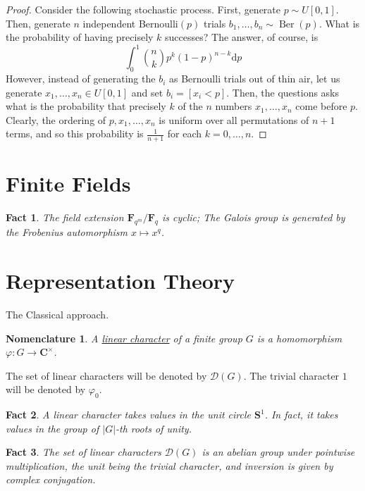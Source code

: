 \documentclass[12pt]{article}
\newtheorem*{fact*}{Fact}
\newtheorem*{nomn*}{Nomenclature}
\newcommand{\abs}[1]{\left\lvert#1\right\rvert}
\DeclareMathOperator{\ber}{Ber}
\renewcommand{\d}{\mathrm{d}}
\newcommand{\vphi}{\varphi}
\newcommand{\C}{\mathbf{C}}
\newcommand{\DD}{\mathscr{D}}
\newcommand{\F}{\mathbf{F}}
\renewcommand{\S}{\mathbf{S}}
\begin{document}
\begin{proof}
Consider the following stochastic process. First, generate $p\sim U[0,1]$. Then, generate $n$ independent Bernoulli$(p)$ trials $b_1,\dots,b_n \sim \ber(p)$. What is the probability of having precisely $k$ successes? The answer, of course, is
\[
\int_0^1 \binom{n}{k}p^{k}(1-p)^{n-k} \d p
\]
However, instead of generating the $b_i$ as Bernoulli trials out of thin air, let us generate $x_1,\dots,x_n\in U[0,1]$ and set $b_i = [x_i < p]$. Then, the questions asks what is the probability that precisely $k$ of the $n$ numbers $x_1,\dots,x_n$ come before $p$. Clearly, the ordering of $p,x_1,\dots,x_n$ is uniform over all permutations of $n+1$ terms, and so this probability is $\frac{1}{n+1}$ for each $k=0,\dots,n$.
\end{proof}


\newpage
\section{Finite Fields}


\begin{fact*}
The field extension $\F_{q^m}/\F_q$ is cyclic; The Galois group is generated by the Frobenius automorphism $x\mapsto x^{q}$.
\end{fact*}

\newpage
\section{Representation Theory}


The Classical approach.


\begin{nomn*}
A \underline{linear character} of a finite group $G$ is a homomorphism $\vphi : G\to\C^\times$.
\end{nomn*}


The set of linear characters will be denoted by $\DD(G)$. The trivial character $1$ will be denoted by $\vphi_0$.


\begin{fact*}
A linear character takes values in the unit circle $\S^1$. In fact, it takes values in the group of $\abs{G}$-th roots of unity.
\end{fact*}


\begin{fact*}
The set of linear characters $\DD(G)$ is an abelian group under pointwise multiplication, the unit being the trivial character, and inversion is given by complex conjugation. 
\end{fact*}
\end{document}
